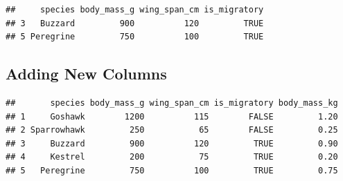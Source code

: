 \documentclass[
]{article}
\newenvironment{Shaded}{\begin{snugshade}}{\end{snugshade}}
\newcommand{\CommentTok}[1]{\textcolor[rgb]{0.56,0.35,0.01}{\textit{#1}}}
\newcommand{\ConstantTok}[1]{\textcolor[rgb]{0.56,0.35,0.01}{#1}}
\newcommand{\DecValTok}[1]{\textcolor[rgb]{0.00,0.00,0.81}{#1}}
\newcommand{\FunctionTok}[1]{\textcolor[rgb]{0.13,0.29,0.53}{\textbf{#1}}}
\newcommand{\NormalTok}[1]{#1}
\newcommand{\OtherTok}[1]{\textcolor[rgb]{0.56,0.35,0.01}{#1}}
\newcommand{\SpecialCharTok}[1]{\textcolor[rgb]{0.81,0.36,0.00}{\textbf{#1}}}
\newcommand{\StringTok}[1]{\textcolor[rgb]{0.31,0.60,0.02}{#1}}
\begin{document}
\begin{Shaded}
\end{Shaded}

\begin{verbatim}
##     species body_mass_g wing_span_cm is_migratory
## 3   Buzzard         900          120         TRUE
## 5 Peregrine         750          100         TRUE
\end{verbatim}

\subsection{Adding New Columns}\label{adding-new-columns}

\begin{Shaded}
\end{Shaded}

\begin{verbatim}
##       species body_mass_g wing_span_cm is_migratory body_mass_kg
## 1     Goshawk        1200          115        FALSE         1.20
## 2 Sparrowhawk         250           65        FALSE         0.25
## 3     Buzzard         900          120         TRUE         0.90
## 4     Kestrel         200           75         TRUE         0.20
## 5   Peregrine         750          100         TRUE         0.75
\end{verbatim}

\begin{Shaded}
\end{Shaded}
\end{document}
